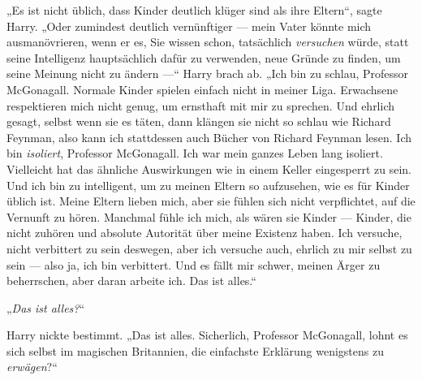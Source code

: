 „Es ist nicht üblich, dass Kinder deutlich klüger sind als ihre Eltern“, sagte Harry.
„Oder zumindest deutlich vernünftiger — mein Vater könnte mich ausmanövrieren, wenn er es, Sie wissen schon, tatsächlich \emph{versuchen} würde, statt seine Intelligenz hauptsächlich dafür zu verwenden, neue Gründe zu finden, um seine Meinung nicht zu ändern —“ Harry brach ab.
„Ich bin zu schlau, Professor McGonagall. Normale Kinder spielen einfach nicht in meiner Liga. Erwachsene respektieren mich nicht genug, um ernsthaft mit mir zu sprechen. Und ehrlich gesagt, selbst wenn sie es täten, dann klängen sie nicht so schlau wie Richard Feynman, also kann ich stattdessen auch Bücher von Richard Feynman lesen. Ich bin \emph{isoliert}, Professor McGonagall. Ich war mein ganzes Leben lang isoliert. Vielleicht hat das ähnliche Auswirkungen wie in einem Keller eingesperrt zu sein. Und ich bin zu intelligent, um zu meinen Eltern so aufzusehen, wie es für Kinder üblich ist. Meine Eltern lieben mich, aber sie fühlen sich nicht verpflichtet, auf die Vernunft zu hören. Manchmal fühle ich mich, als wären sie Kinder — Kinder, die nicht zuhören und absolute Autorität über meine Existenz haben. Ich versuche, nicht verbittert zu sein deswegen, aber ich versuche auch, ehrlich zu mir selbst zu sein — also ja, ich bin verbittert. Und es fällt mir schwer, meinen Ärger zu beherrschen, aber daran arbeite ich. Das ist alles.“

„\emph{Das ist alles?}“

Harry nickte bestimmt.
„Das ist alles. Sicherlich, Professor McGonagall, lohnt es sich selbst im magischen Britannien, die einfachste Erklärung wenigstens zu \emph{erwägen}?“

\later

